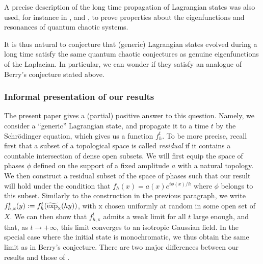\documentclass[JEP,XML,SOM,Unicode,published]{cedram}
\theoremstyle{plain}
\theoremstyle{definition}
\begin{document}
A precise description of the long time propagation of Lagrangian states was also used, for instance in \cite{Anan}, \cite{AN} and \cite{NZ}, to prove properties about the eigenfunctions and resonances of quantum chaotic systems.

It is thus natural to conjecture that (generic) Lagrangian states evolved during a long time satisfy the same quantum chaotic conjectures as genuine eigenfunctions of the Laplacian. In particular, we can wonder if they satisfy an analogue of Berry's conjecture stated above.\enlargethispage{1.2\baselineskip}%

\subsubsection*{Informal presentation of our results}
The present paper gives a (partial) positive answer to this question. Namely, we consider a ``generic'' Lagrangian state, and propagate it to a time $t$ by the Schrödinger equation, which gives us a function $f_h^t$. To be more precise, recall first that a subset of a topological space is called \emph{residual} if it contains a countable intersection of dense open subsets. We will first equip the space of phases $\phi$ defined on the support of a fixed amplitude $a$ with a natural topology. We then construct a residual subset of the space of phases such that our result will hold under the condition that $f_h(x)=a(x)e^{i\phi(x)/h}$ where $\phi$ belongs to this subset. Similarly to the construction in the previous paragraph, we write $f_{h,\mathrm{x}}^t(y):= f^t_h(\widetilde{\exp}_{\textsc{x}}(hy))$, with $\mathrm{x}$ chosen uniformly at random in some open set of $X$. We can then show that $f_{h,\mathrm{x}}^t$ admits a weak limit for all $t$ large enough, and that, as $t\to +\infty$, this limit converges to an isotropic Gaussian field. In the special case where the initial state is monochromatic, we thus obtain the same limit as in Berry's conjecture. There are two major differences between our results and those of \cite{Schu}.
\end{document}
